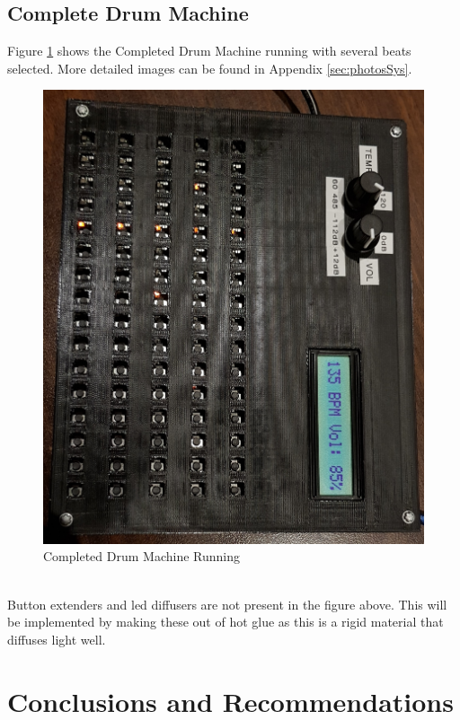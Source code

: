 \documentclass[12pt,a4paper]{report}
\begin{document}
\section{Complete Drum Machine} \label{sec:fullMachine}
Figure \ref{fig:fullSysWorking} shows the Completed Drum Machine running with several beats selected. More detailed images can be found in Appendix \ref{sec:photosSys}.
\begin{figure}[h!]
	\centering
	\includegraphics[width=0.9 \textwidth, angle=180]{angleFull.jpg}
	\caption{Completed Drum Machine Running}
	\label{fig:fullSysWorking}
\end{figure}\\
Button extenders and \ac{led} diffusers are not present in the figure above. This will be implemented by making these out of hot glue as this is a rigid material that diffuses light well.

\chapter{Conclusions and Recommendations}
\end{document}
